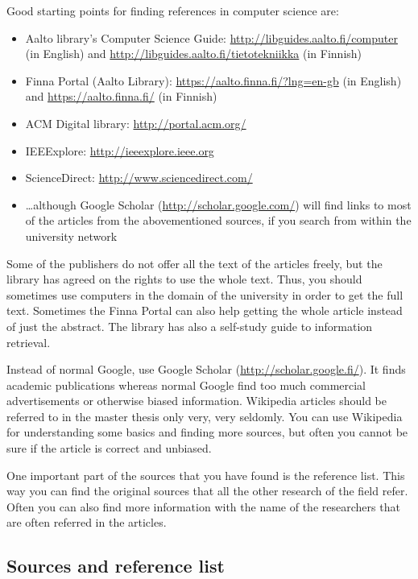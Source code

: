 Good starting points for finding references in computer science are: 
\begin{itemize}
\setlength{\itemsep}{0pt}
\item Aalto library's Computer Science Guide: \url{http://libguides.aalto.fi/computer} 
(in English) and \url{http://libguides.aalto.fi/tietotekniikka} (in Finnish)
\item Finna Portal (Aalto Library): \url{https://aalto.finna.fi/?lng=en-gb} (in English) 
and \url{https://aalto.finna.fi/} (in Finnish)
\item ACM Digital library: \url{http://portal.acm.org/}
\item IEEExplore: \url{http://ieeexplore.ieee.org}
\item ScienceDirect: \url{http://www.sciencedirect.com/}
\item \ldots although Google Scholar (\url{http://scholar.google.com/}) will
find links to most of the articles from the abovementioned sources, if you
search from within the university network
\end{itemize}

Some of the publishers do not offer all the text of the articles
freely, but the library has agreed on the rights to use the whole
text. Thus, you should sometimes use computers in the domain of the
university in order to get the full text. Sometimes the Finna Portal
can also help getting the whole article instead of just the abstract.
The library has also a self-study guide to information retrieval.

Instead of normal Google, use Google Scholar
(\url{http://scholar.google.fi/}). It finds academic publications whereas
normal Google find too much commercial advertisements or otherwise
biased information. Wikipedia articles should be referred to in the master
thesis only very, very seldomly. You can use Wikipedia for understanding
some basics and finding more sources, but often you cannot be sure if
the article is correct and unbiased.

One important part of the sources that you have found is the reference
list. This way you can find the original sources that all the other
research of the field refer. Often you can also find more information
with the name of the researchers that are often referred in the
articles.

\subsection{Sources and reference list}

